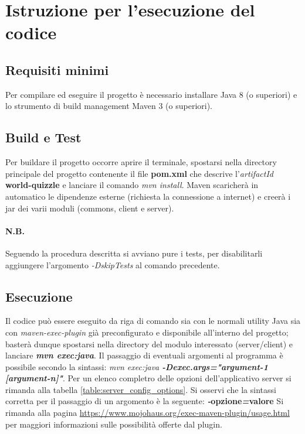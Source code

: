 \documentclass{article}
\begin{document}
    \section{Istruzione per l'esecuzione del codice}

    \subsection{Requisiti minimi}
    Per compilare ed eseguire il progetto è necessario installare Java 8 (o superiori) e lo strumento di build management Maven 3 (o superiori).

    \subsection{Build e Test}
    Per buildare il progetto occorre aprire il terminale, spostarsi nella directory principale del progetto contenente il file \textbf{pom.xml} che descrive l'\emph{artifactId} \textbf{world-quizzle} e lanciare il comando \emph{mvn install}.
    Maven scaricherà in automatico le dipendenze esterne (richiesta la connessione a internet) e creerà i jar dei varii moduli (commons, client e server).
    \paragraph{N.B.} Seguendo la procedura descritta si avviano pure i tests, per disabilitarli aggiungere l'argomento \emph{-DskipTests} al comando precedente.

    \subsection{Esecuzione}
    Il codice può essere eseguito da riga di comando sia con le normali utility Java sia  con \emph{maven-exec-plugin} già preconfigurato e disponibile all'interno del progetto; basterà dunque spostarsi nella directory del modulo interessato (server/client) e lanciare \emph{\textbf{mvn exec:java}}.
    \newline
    Il passaggio di eventuali argomenti al programma è possibile secondo la sintassi: \textit{mvn exec:java \textbf{-Dexec.args="argument-1 [argument-n]"}}. Per un elenco completro delle opzioni dell'applicativo server si rimanda alla tabella \ref{table:server_config_options}. Si osservi che la sintassi corretta per il passaggio di un argomento è la seguente: \textbf{\textit{-}opzione\textit{=}valore}
    \newline
    Si rimanda alla pagina \url{https://www.mojohaus.org/exec-maven-plugin/usage.html} per maggiori informazioni sulle possibilità offerte dal plugin.


    \listoffigures

    \listoftables
\end{document}
